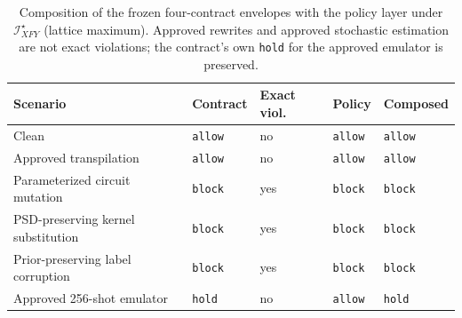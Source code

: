 \begin{table}[!tbp]
\caption{Composition of the frozen four-contract envelopes with the policy layer under $\mathcal I_{XFY}^{\star}$ (lattice maximum). Approved rewrites and approved stochastic estimation are not exact violations; the contract's own \texttt{hold} for the approved emulator is preserved.}
\label{tab:s-composition}
\centering
\scriptsize
\setlength{\tabcolsep}{3pt}
\begin{tabular}{@{}lllll@{}}
\toprule
Scenario & Contract & Exact viol. & Policy & Composed \\
\midrule
Clean & \texttt{allow} & no & \texttt{allow} & \texttt{allow} \\
Approved transpilation & \texttt{allow} & no & \texttt{allow} & \texttt{allow} \\
Parameterized circuit mutation & \texttt{block} & yes & \texttt{block} & \texttt{block} \\
PSD-preserving kernel substitution & \texttt{block} & yes & \texttt{block} & \texttt{block} \\
Prior-preserving label corruption & \texttt{block} & yes & \texttt{block} & \texttt{block} \\
Approved 256-shot emulator & \texttt{hold} & no & \texttt{allow} & \texttt{hold} \\
\bottomrule
\end{tabular}
\end{table}

